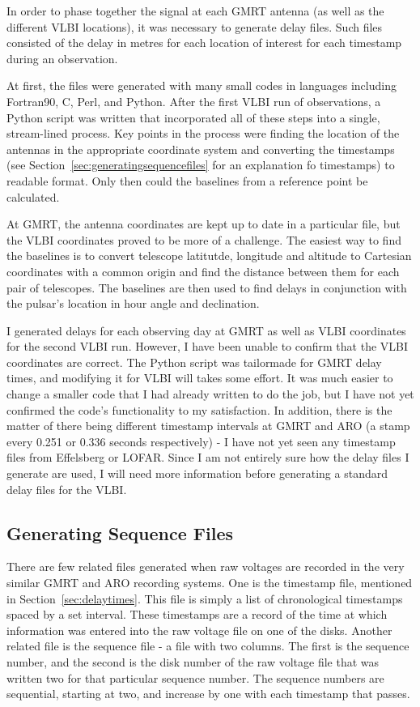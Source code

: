 \documentclass[a4paper,12pt]{article}
\begin{document}
In order to phase together the signal at each GMRT antenna (as well as the different VLBI locations), it was necessary to generate delay files. Such files consisted of the delay in metres for each location of interest for each timestamp during an observation.

At first, the files were generated with many small codes in languages including Fortran90, C, Perl, and Python. After the first VLBI run of observations, a Python script was written that incorporated all of these steps into a single, stream-lined process. Key points in the process were finding the location of the antennas in the appropriate coordinate system and converting the timestamps (see Section~\ref{sec:generatingsequencefiles} for an explanation fo timestamps) to readable format. Only then could the baselines from a reference point be calculated.

At GMRT, the antenna coordinates are kept up to date in a particular file, but the VLBI coordinates proved to be more of a challenge. The easiest way to find the baselines is to convert telescope latitutde, longitude and altitude to Cartesian coordinates with a common origin and find the distance between them for each pair of telescopes. The baselines are then used to find delays in conjunction with the pulsar's location in hour angle and declination.

I generated delays for each observing day at GMRT as well as VLBI coordinates for the second VLBI run. However, I have been unable to confirm that the VLBI coordinates are correct. The Python script was tailormade for GMRT delay times, and modifying it for VLBI will takes some effort. It was much easier to change a smaller code that I had already written to do the job, but I have not yet confirmed the code's functionality to my satisfaction. In addition, there is the matter of there being different timestamp intervals at GMRT and ARO (a stamp every 0.251 or 0.336 seconds respectively) - I have not yet seen any timestamp files from Effelsberg or LOFAR. Since I am not entirely sure how the delay files I generate are used, I will need more information before generating a standard delay files for the VLBI.

\subsection{Generating Sequence Files}
\label{generatingsequencefiles}
There are few related files generated when raw voltages are recorded in the very similar GMRT and ARO recording systems. One is the timestamp file, mentioned in Section~\ref{sec:delaytimes}. This file is simply a list of chronological timestamps spaced by a set interval. These timestamps are a record of the time at which information was entered into the raw voltage file on one of the disks. Another related file is the sequence file - a file with two columns. The first is the sequence number, and the second is the disk number of the raw voltage file that was written two for that particular sequence number. The sequence numbers are sequential, starting at two, and increase by one with each timestamp that passes.
\end{document}
